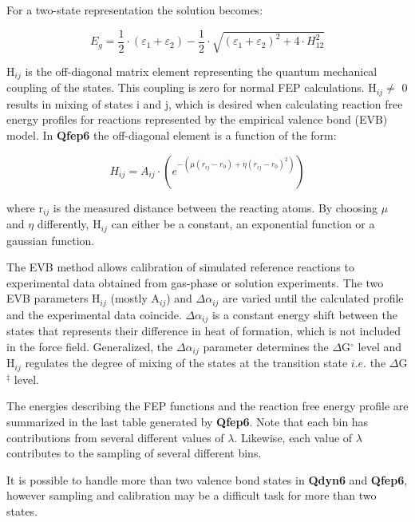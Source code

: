\documentclass[a4paper,11pt]{article}
\begin{document}
For a two-state representation the solution becomes:

\begin {equation}
\label{two_state} E_g =\textstyle{\frac{1}{2}}\cdot \left(
{\varepsilon_1 + \varepsilon_2 } \right) -
\textstyle{\frac{1}{2}}\cdot \sqrt {\left( \varepsilon_1 +
\varepsilon_2 \right)^2 + 4\cdot H^2_{12}}
\end{equation}

H$_{ij}$ is the off-diagonal matrix element representing the
quantum mechanical coupling of the states. This coupling is zero
for normal FEP calculations. H$_{ij} \ne $ 0 results in mixing of
states i and j, which is desired when calculating reaction free
energy profiles for reactions represented by the empirical valence
bond (EVB) model. In \textbf{Qfep6} the off-diagonal element is a function
of the form:

\begin {equation}
H_{ij}=A_{ij}\cdot (e^{-(\mu (r_{ij}-r_{0}) + \eta
(r_{ij}-r_{0})^{2})})
\end {equation}

where r$_{ij}$ is the measured distance between the reacting
atoms. By choosing $\mu $ and $\eta $ differently, H$_{ij}$ can
either be a constant, an exponential function or a gaussian
function.

The EVB method allows calibration  of simulated reference reactions to
experimental data obtained from gas-phase or solution experiments. The
two  EVB  parameters H$_{ij}$  (mostly  A$_{ij}$)  and $\Delta  \alpha
_{ij}$ are  varied until the  calculated profile and  the experimental
data  coincide.  $\Delta \alpha  _{ij}$  is  a constant  energy  shift
between  the  states  that  represents their  difference  in  heat  of
formation, which is not included  in the force field. Generalized, the
$\Delta \alpha  _{ij}$ parameter  determines the  $\Delta $G$^{\circ}$
level and H$_{ij}$ regulates the degree of mixing of the states at the
transition state $i.e.$ the $\Delta$G$^{\ddag }$ level.

The energies describing the FEP functions and the reaction free energy
profile are summarized  in the last table  generated by \textbf{Qfep6}.
Note that each bin has  contributions from several different values of
$\lambda$.  Likewise,  each  value  of $\lambda$  contributes  to  the
sampling of several different bins.

It  is  possible to  handle  more  than  two  valence bond  states  in
\textbf{Qdyn6} and \textbf{Qfep6}, however  sampling and calibration may
be a difficult task for more than two states.
\end{document}
